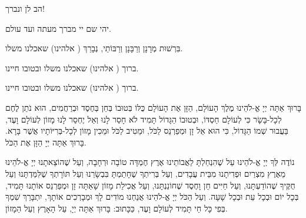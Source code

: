 

\break

\begin{center}

הב לן ונברך!


יהי שם יי מברך מעתה ועד עולם.


בִּרְשׁוּת מְרָנָן וְרַבָּנָן וְרַבּוֹתַי, נְבָרֵךְ ( אלהינו) שאכלנו משלו.


ברוך ( אלהינו) שאכלנו משלו ובטובו חיינו.


ברוך ( אלהינו) שאכלנו משלו ובטובו חיינו.
\end{center}

בָּרוּךְ אַתָּה יְיָ אֱ-לֹהֵינוּ מֶלֶךְ הָעוֹלָם, הַזָּן אֶת הָעוֹלָם כֻּלּוֹ בְּטוּבוֹ בְּחֵן בְּחֶסֶד וּבְרַחֲמִים, הוּא נֹתֵן לֶחֶם לְכָל-בָּשָׂר כִּי לְעוֹלָם חַסְדּוֹ, וּבְטוּבוֹ הַגָּדוֹל תָּמִיד לֹא חָסַר לָנוּ וְאַל יֶחְסַר לָנוּ מָזוֹן לְעוֹלָם וָעֶד, בַּעֲבוּר שְׁמוֹ הַגָּדוֹל, כִּי הוּא אֵל זָן וּמְפַרְנֵס לַכֹּל, וּמֵטִיב לַכֹּל וּמֵכִין מָזוֹן לְכָל-בְּרִיּוֹתָיו אֲשֶׁר בָּרָא. בָּרוּךְ אַתָּה יְיָ הַזָּן אֶת הַכֹּל.

נוֹדֶה לְּךָ יְיָ אֱ-לֹהֵינוּ עַל שֶׁהִנְחַלְתָּ לַאֲבוֹתֵינוּ אֶרֶץ חֶמְדָּה טוֹבָה וּרְחָבָה, וְעַל שֶׁהוֹצֵאתָנוּ יְיָ אֱ-לֹהֵינוּ מֵאֶרֶץ מִצְרַיִם וּפְדִיתָנוּ מִבֵּית עֲבָדִים, וְעַל בְּרִיתְךָ שֶׁחָתַמְתָּ בִּבְשָׂרֵנוּ וְעַל תּוֹרָתְךָ שֶׁלִּמַּדְתָּנוּ וְעַל חֻקֶּיךָ שֶׁהוֹדַעְתָּנוּ, וְעַל חַיִּים חֵן וָחֶסֶד שֶׁחוֹנַנְתָּנוּ, וְעַל אֲכִילַת מָזוֹן שָׁאַתָּה זָן וּמְפַרְנֵס אוֹתָנוּ תָּמִיד, בְּכָל יוֹם וּבְכָל עֵת וּבְכָל שָׁעָה. וְעַל הַכֹּל יְיָ אֱ-לֹהֵינוּ אֲנַחְנוּ מוֹדִים לָךְ וּמְבָרְכִים אוֹתָךְ, יִתְבָּרַךְ שִׁמְךָ בְּפִי כָּל חַי תָּמִיד לְעוֹלָם וָעֶד, כַּכָּתוּב: 
בָּרוּךְ אַתָּה יְיָ, עַל הָאָרֶץ וְעַל הַמָזוֹן.


